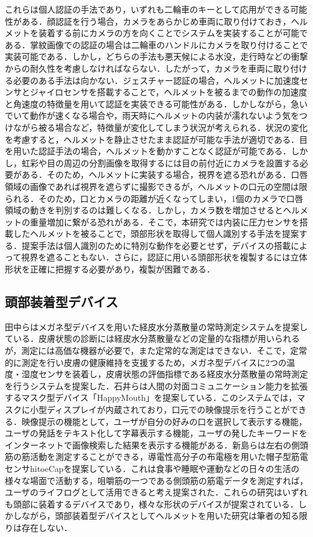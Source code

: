 \documentclass[Japanese,noauthor]{dicomopapers}
\begin{document}
これらは個人認証の手法であり，いずれも二輪車のキーとして応用ができる可能性がある．顔認証を行う場合，カメラをあらかじめ車両に取り付けておき，ヘルメットを装着する前にカメラの方を向くことでシステムを実装することが可能である．掌紋画像での認証の場合は二輪車のハンドルにカメラを取り付けることで実装可能である．しかし，どちらの手法も悪天候による水没，走行時などの衝撃からの耐久性を考慮しなければならない．したがって，カメラを車両に取り付ける必要のある手法は向かない．ジェスチャー認証の場合，ヘルメットに加速度センサとジャイロセンサを搭載することで，ヘルメットを被るまでの動作の加速度と角速度の特徴量を用いて認証を実装できる可能性がある．しかしながら，急いでいて動作が速くなる場合や，雨天時にヘルメットの内装が濡れないよう気をつけながら被る場合など，特徴量が変化してしまう状況が考えられる．状況の変化を考慮すると，ヘルメットを静止させたまま認証が可能な手法が適切である．目を用いた認証手法の場合，ヘルメットを動かすことなく認証が可能である．しかし，虹彩や目の周辺の分割画像を取得するには目の前付近にカメラを設置する必要がある．そのため，ヘルメットに実装する場合，視界を遮る恐れがある．口唇領域の画像であれば視界を遮らずに撮影できるが，ヘルメットの口元の空間は限られる．そのため，口とカメラの距離が近くなってしまい，1個のカメラで口唇領域の動きを判別するのは難しくなる．しかし，カメラ数を増加させるとヘルメットの重量増加に繋がる恐れがある．そこで，本研究では内装に圧力センサを搭載したヘルメットを被ることで，頭部形状を取得して個人識別する手法を提案する．提案手法は個人識別のために特別な動作を必要とせず，デバイスの搭載によって視界を遮ることもない．さらに，認証に用いる頭部形状を複製するには立体形状を正確に把握する必要があり，複製が困難である．

\subsection{頭部装着型デバイス}
田中ら\cite{glasses}はメガネ型デバイスを用いた経皮水分蒸散量の常時測定システムを提案している．皮膚状態の診断には経皮水分蒸散量などの定量的な指標が用いられるが，測定には高価な機器が必要で，また定常的な測定はできない．そこで，定常的に測定を行い皮膚の健康維持を支援するため，メガネ型デバイスに2つの温度・湿度センサを装着し，皮膚状態の評価指標である経皮水分蒸散量の常時測定を行うシステムを提案した．石井ら\cite{happymouth}は人間の対面コミュニケーション能力を拡張するマスク型デバイス「HappyMouth」を提案している．このシステムでは，マスクに小型ディスプレイが内蔵されており，口元での映像提示を行うことができる．映像提示の機能として，ユーザが自分の好みの口を選択して表示する機能，ユーザの発話をテキスト化して字幕表示する機能，ユーザの発したキーワードをインターネットで画像検索した結果を表示する機能がある．新島ら\cite{cap_sensor}は左右の側頭筋の筋活動を測定することができる，導電性高分子の布電極を用いた帽子型筋電センサhitoeCapを提案している．これは食事や睡眠や運動などの日々の生活の様々な場面で活動する，咀嚼筋の一つである側頭筋の筋電データを測定すれば，ユーザのライフログとして活用できると考え提案された．これらの研究はいずれも頭部に装着するデバイスであり，様々な形状のデバイスが提案されている．しかしながら，頭部装着型デバイスとしてヘルメットを用いた研究は筆者の知る限りは存在しない．
\end{document}
